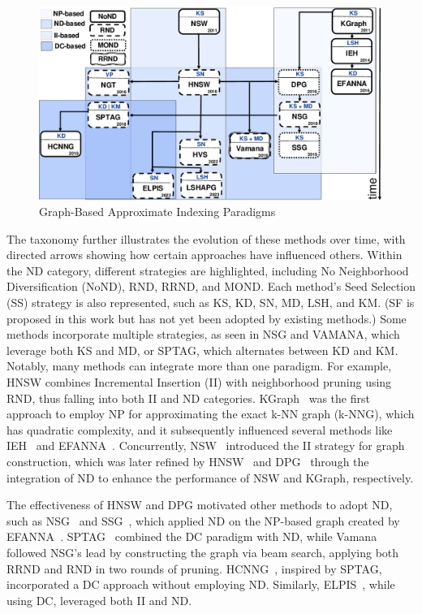 \begin{figure}[ht] 
\centering
		\captionsetup{justification=centering}
		\includegraphics[width=\columnwidth]{../img/graphfamily/RoadMAPGANNS.pdf}
		\caption{Graph-Based Approximate Indexing Paradigms}        
		\label{fig:roadmap}
\end{figure}
The taxonomy further illustrates the evolution of these methods over time, with directed arrows showing how certain approaches have influenced others. Within the ND category, different strategies are highlighted, including No Neighborhood Diversification (NoND), RND, RRND, and MOND. Each method's Seed Selection (SS) strategy is also represented, such as KS, KD, SN, MD, LSH, and KM. (SF is proposed in this work but has not yet been adopted by existing methods.) Some methods incorporate multiple strategies, as seen in NSG and VAMANA, which leverage both KS and MD, or SPTAG, which alternates between KD and KM. Notably, many methods can integrate more than one paradigm. For example, HNSW combines Incremental Insertion (II) with neighborhood pruning using RND, thus falling into both II and ND categories.
KGraph~\cite{kgraph} was the first approach to employ NP for approximating the exact k-NN graph (k-NNG), which has quadratic complexity, and it subsequently influenced several methods like IEH~\cite{ieh} and EFANNA~\cite{efanna}. Concurrently, NSW~\cite{nsw11} introduced the II strategy for graph construction, which was later refined by HNSW~\cite{hnsw} and DPG~\cite{dpg} through the integration of ND to enhance the performance of NSW and KGraph, respectively.

The effectiveness of HNSW and DPG motivated other methods to adopt ND, such as NSG~\cite{nsg} and SSG~\cite{nssg}, which applied ND on the NP-based graph created by EFANNA~\cite{efanna}. SPTAG~\cite{SPTAG4} combined the DC paradigm with ND, while Vamana~\cite{vamana} followed NSG’s lead by constructing the graph via beam search, applying both RRND and RND in two rounds of pruning. HCNNG~\cite{hcnng}, inspired by SPTAG, incorporated a DC approach without employing ND. Similarly, ELPIS~\cite{elpis}, while using DC, leveraged both II and ND.

